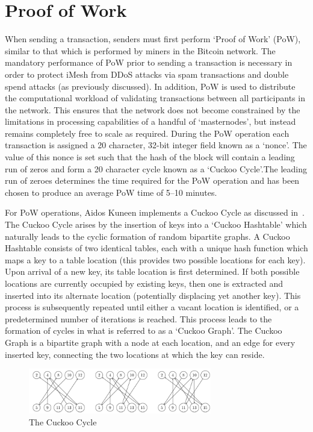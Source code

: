 \documentclass[a4paper,10pt,twocolumn]{article}
\begin{document}
\section{Proof of Work}
\label{sec:PoW}

When sending a transaction, senders must first perform `Proof of Work' (PoW), similar to that which is performed by miners in the 
Bitcoin network. The mandatory performance of PoW prior to sending a transaction is necessary in order to protect iMesh from DDoS 
attacks via spam transactions and double spend attacks (as previously discussed). In addition, PoW is used to distribute the 
computational workload of validating transactions between all participants in the network. This ensures that the network does not 
become constrained by the limitations in processing capabilities of a handful of `masternodes', but instead remains completely free to 
scale as required. During the PoW operation each transaction is assigned a 20 character, 32-bit integer field known as a `nonce'. 
The value of this nonce is set such that the hash of the block will contain a leading run of zeros and form a 20 character cycle known 
as a `Cuckoo Cycle'.The leading run of zeroes determines the time required for the PoW operation and has been chosen to produce an 
average PoW time of 5--10 minutes.

For PoW operations, Aidos Kuneen implements a Cuckoo Cycle as discussed in~\cite{cuckoo}. The Cuckoo Cycle arises by the insertion of
keys into a `Cuckoo Hashtable' which naturally leads to the cyclic formation of random bipartite graphs. A Cuckoo Hashtable consists of 
two identical tables, each with a unique hash function which maps a key to a table location (this provides two possible locations for 
each key). Upon arrival of a new key, its table location is first determined. If both possible locations are currently occupied by 
existing keys, then one is extracted and inserted into its alternate location (potentially displacing yet another key). This process is 
subsequently repeated until either a vacant location is identified, or a predetermined number of iterations is reached. This process 
leads to the formation of cycles in what is referred to as a `Cuckoo Graph'. The Cuckoo Graph is a bipartite graph with a node at each 
location, and an edge for every inserted key, connecting the two locations at which the key can reside.

\begin{figure}[ht]
	\begin{center}
	\includegraphics[width=80mm]{cuckoo.png}
	  \caption{The Cuckoo Cycle}
    \label{fig:cuckoo}
	\end{center}
 \end{figure}
\end{document}
